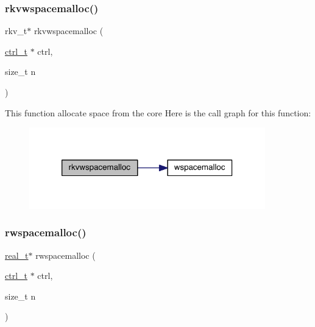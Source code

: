 \subsubsection{\texorpdfstring{rkvwspacemalloc()}{rkvwspacemalloc()}}
{\footnotesize\ttfamily rkv\+\_\+t$\ast$ rkvwspacemalloc (\begin{DoxyParamCaption}\item[{\hyperlink{a00742}{ctrl\+\_\+t} $\ast$}]{ctrl,  }\item[{size\+\_\+t}]{n }\end{DoxyParamCaption})}

This function allocate space from the core Here is the call graph for this function\+:\nopagebreak
\begin{figure}[H]
\begin{center}
\leavevmode
\includegraphics[width=290pt]{a00984_adfa1dc5e723d63f32672d993e3f52e4f_cgraph}
\end{center}
\end{figure}
\mbox{\label{a00984_ad1c3f444b6873f0bfdb82e1bb98372d5}} 
\subsubsection{\texorpdfstring{rwspacemalloc()}{rwspacemalloc()}}
{\footnotesize\ttfamily \hyperlink{a00876_a1924a4f6907cc3833213aba1f07fcbe9}{real\+\_\+t}$\ast$ rwspacemalloc (\begin{DoxyParamCaption}\item[{\hyperlink{a00742}{ctrl\+\_\+t} $\ast$}]{ctrl,  }\item[{size\+\_\+t}]{n }\end{DoxyParamCaption})}


